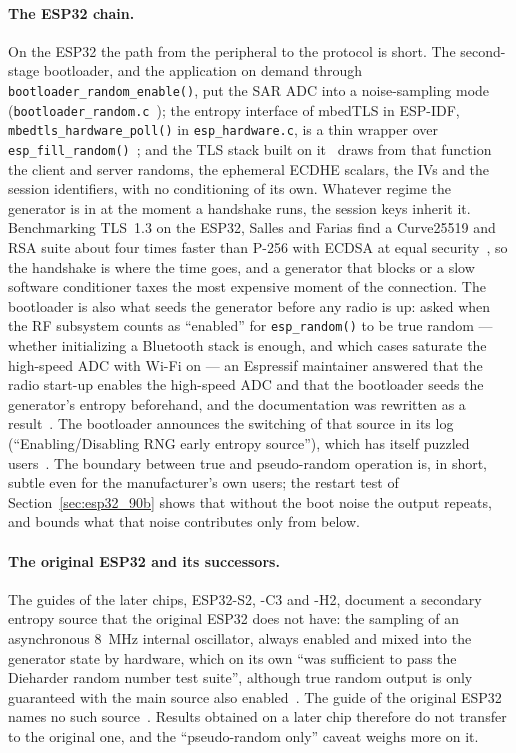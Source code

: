 {\sloppy
\paragraph{The ESP32 chain.} On the ESP32 the path from the peripheral to
the protocol is short. The second-stage bootloader, and the application on
demand through \texttt{bootloader\_\allowbreak{}random\_\allowbreak{}enable()}, put the SAR ADC into
a noise-sampling mode (\texttt{bootloader\_\allowbreak{}random.c}~\cite{espressif_bootloader_random});
the entropy interface of mbedTLS in ESP-IDF, \texttt{mbedtls\_\allowbreak{}hardware\_\allowbreak{}poll()}
in \texttt{esp\_\allowbreak{}hardware.c}, is a thin wrapper over
\texttt{esp\_\allowbreak{}fill\_\allowbreak{}random()}~\cite{espressif_esp_hardware}; and the TLS
stack built on it~\cite{espressif_mbedtls} draws from that function the
client and server randoms, the ephemeral ECDHE scalars, the IVs and the
session identifiers, with no conditioning of its own. Whatever regime the
generator is in at the moment a handshake runs, the session keys inherit
it. Benchmarking TLS~1.3 on the
ESP32, Salles and Farias find a Curve25519 and RSA suite about four times
faster than P-256 with ECDSA at equal security~\cite{salles_2023_iotst}, so
the handshake is where the time goes, and a generator that
blocks or a slow software conditioner taxes the most expensive moment of
the connection. The bootloader is also what seeds the generator before any
radio is up: asked when the RF subsystem counts as ``enabled'' for
\texttt{esp\_\allowbreak{}random()} to be true random --- whether initializing a
Bluetooth stack is enough, and which cases saturate the high-speed ADC with
Wi-Fi on --- an Espressif maintainer answered that the radio start-up
enables the high-speed ADC and that the bootloader seeds the generator's
entropy beforehand, and the documentation was rewritten as a
result~\cite{espressif_issue_14665}. The bootloader announces the switching
of that source in its log (``Enabling\slash Disabling RNG early entropy
source''), which has itself puzzled users~\cite{espressif_issue_7598}. The
boundary between true and pseudo-random operation is, in short, subtle
even for the manufacturer's own users; the restart test of
Section~\ref{sec:esp32_90b} shows that without the boot noise the output
repeats, and bounds what that noise contributes only from below.\par}

\paragraph{The original ESP32 and its successors.} The guides of the
later chips, ESP32-S2, -C3 and -H2, document a secondary entropy source
that the original ESP32 does not have: the sampling of an asynchronous
8~MHz internal oscillator, always enabled and mixed into the generator
state by hardware, which on its own ``was sufficient to pass the Dieharder
random number test suite'', although true random output is only guaranteed
with the main source also enabled~\cite{espressif_idf_random_c3}. The
guide of the original ESP32 names no such source~\cite{espressif_idf_random}.
Results obtained on a later chip therefore do not transfer to the original
one, and the ``pseudo-random only'' caveat weighs more on it.

